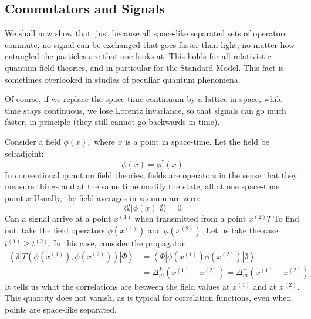 \documentclass[main.tex]{subfiles}
\begin{document}
\subsection{Commutators and Signals}\label{ch20.7}

We shall now show that, just because all space-like separated sets of operators commute, no signal can be exchanged that goes faster than light, no matter how entangled the particles are that one looks at. This holds for all relativistic quantum field theories, and in particular for the Standard Model. This fact is sometimes overlooked in studies of peculiar quantum phenomena.

Of course, if we replace the space-time continuum by a lattice in space, while time stays continuous, we lose Lorentz invariance, so that signals can go much faster, in principle (they still cannot go backwards in time).

Consider a field $\phi(x),$ where $x$ is a point in space-time. Let the field be selfadjoint:
$$
\phi(x)=\phi^{\dagger}(x)
$$
In conventional quantum field theories, fields are operators in the sense that they measure things and at the same time modify the state, all at one space-time point $x$ Usually, the field averages in vacuum are zero:
$$
\langle\emptyset|\phi(x)| \emptyset\rangle= 0
$$
Can a signal arrive at a point $x^{(1)}$ when transmitted from a point $x^{(2)} ?$ To find out, take the field operators $\phi\left(x^{(1)}\right)$ and $\phi\left(x^{(2)}\right) .$ Let us take the case $t^{(1)} \geq t^{(2)} .$ In this case, consider the propagator
$$
\begin{aligned}
\left\langle\emptyset\left|T\left(\phi\left(x^{(1)}\right), \phi\left(x^{(2)}\right)\right)\right| \Phi\right\rangle &=\left\langle\Phi\left|\phi\left(x^{(1)}\right) \phi\left(x^{(2)}\right)\right| \emptyset\right\rangle \\
&=\Delta_{m}^{F}\left(x^{(1)}-x^{(2)}\right)=\Delta_{m}^{+}\left(x^{(1)}-x^{(2)}\right)
\end{aligned}
$$
It tells us what the correlations are between the field values at $x^{(1)}$ and at $x^{(2)} .$ This quantity does not vanish, as is typical for correlation functions, even when points are space-like separated.
\end{document}
